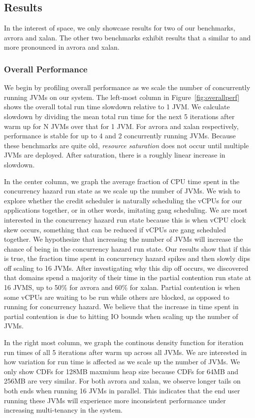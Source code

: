 \documentclass{sig-alternate}
\begin{document}
\subsection{Results}
In the interest of space, we only showcase results for two of our benchmarks, avrora and xalan. The other two benchmarks exhibit results that a similar to and more pronounced in avrora and xalan.

\subsubsection{Overall Performance} \label{sssec:overallperfresults}
We begin by profiling overall performance as we scale the number of concurrently running JVMs on our system. The left-most column in Figure~\ref{fig:overallperf} shows the overall total run time slowdown relative to 1 JVM. We calculate slowdown by dividing the mean total run time for the next 5 iterations after warm up for N JVMs over that for 1 JVM. For avrora and xalan respectively, performance is stable for up to 4 and 2 concurrently running JVMs. Because these benchmarks are quite old, \textit{resource saturation} does not occur until multiple JVMs are deployed. After saturation, there is a roughly linear increase in slowdown.

In the center column, we graph the average fraction of CPU time spent in the concurrency hazard run state as we scale up the number of JVMs. We wish to explore whether the credit scheduler is naturally scheduling the vCPUs for our applications together, or in other words, imitating gang scheduling. We are most interested in the concurrency hazard run state because this is when vCPU clock skew occurs, something that can be reduced if vCPUs are gang scheduled together. We hypothesize that increasing the number of JVMs will increase the chance of being in the concurrency hazard run state. Our results show that if this is true, the fraction time spent in concurrency hazard spikes and then slowly dips off scaling to 16 JVMs. After investigating why this dip off occurs, we discovered that domains spend a majority of their time in the partial contention run state at 16 JVMS, up to 50\% for avrora and 60\% for xalan. Partial contention is when some vCPUs are waiting to be run while others are blocked, as opposed to running for concurrency hazard. We believe that the increase in time spent in partial contention is due to hitting IO bounds when scaling up the number of JVMs.

In the right most column, we graph the continous density function for iteration run times of all 5 iterations after warm up across all JVMs. We are interested in how variation for run time is affected as we scale up the number of JVMs. We only show CDFs for 128MB maxmium heap size because CDFs for 64MB and 256MB are very similar. For both avrora and xalan, we observe longer tails on both ends when running 16 JVMs in parallel. This indicates that the end user running these JVMs will experience more inconsistent performance under increasing multi-tenancy in the system. 
\end{document}
